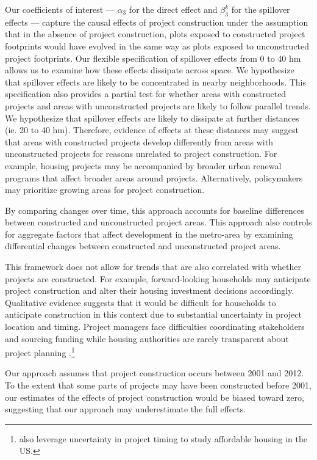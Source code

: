 \documentclass[12pt]{article}
\begin{document}
Our coefficients of interest --- $\alpha_3$ for the direct effect and $\beta_3^{k}$ for the spillover effects --- capture the causal effects of project construction under the assumption that in the absence of project construction, plots exposed to constructed project footprints would have evolved in the same way as plots exposed to unconstructed project footprints.  Our flexible specification of spillover effects from 0 to 40 hm allows us to examine how these effects dissipate across space.  We hypothesize that spillover effects are likely to be concentrated in nearby neighborhoods.  This specification also provides a partial test for whether areas with constructed projects and areas with unconstructed projects are likely to follow parallel trends.  We hypothesize that spillover effects are likely to dissipate at further distances (ie. 20 to 40 hm).  Therefore, evidence of effects at these distances may suggest that areas with constructed projects develop differently from areas with unconstructed projects for reasons unrelated to project construction.  For example, housing projects may be accompanied by broader urban renewal programs that affect broader areas around projects.  Alternatively, policymakers may prioritize growing areas for project construction.

By comparing changes over time, this approach accounts for baseline differences between constructed and unconstructed project areas.  This approach also controls for aggregate factors that affect development in the metro-area by examining differential changes between constructed and unconstructed project areas.  

This framework does not allow for trends that are also correlated with whether projects are constructed.  For example, forward-looking households may anticipate project construction and alter their housing investment decisions accordingly.  Qualitative evidence suggests that it would be difficult for households to anticipate construction in this context due to substantial uncertainty in project location and timing.  Project managers face difficulties coordinating stakeholders and sourcing funding while housing authorities are rarely transparent about project planning \citep{serihistory}.\footnote{\cite{diamond2016wants} also leverage uncertainty in project timing to study affordable housing in the US.} 

Our approach assumes that project construction occurs between 2001 and 2012.  To the extent that some parts of projects may have been constructed before 2001, our estimates of the effects of project construction would be biased toward zero, suggesting that our approach may underestimate the full effects.
\end{document}
